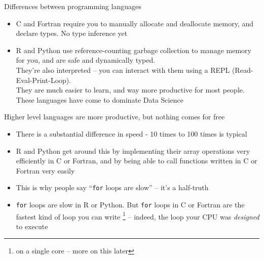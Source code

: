 \documentclass{beamer}
\begin{document}
\begin{frame}{Differences between programming languages}
	\begin{itemize}	
		\item C and Fortran require you to manually allocate and deallocate
		memory, and declare types. No type inference yet
		
		\item R and Python use reference-counting garbage collection to manage
		memory for you, and are safe and dynamically typed.
		\\
		They're also
		interpreted -- you can interact with them using a REPL (Read-Eval-Print-Loop).
		\\
		They are much easier to learn, and way more productive for most people.
		These languages have come to dominate Data Science
	\end{itemize} 
\end{frame}

\begin{frame}{Higher level languages are more productive, but nothing comes for free}
	\begin{itemize}
		\item There is a substantial difference in speed - 10 times to 100 times
		is typical

		\item R and Python get around this by implementing their array operations
		very efficiently in C or Fortran, and by being able to call functions written
		in C or Fortran very easily

		\item This is why people say ``\texttt{for} loops are slow''
		-- it's a half-truth

		\item \texttt{for} loops are slow in R or Python.
		But \texttt{for} loops in C or Fortran are the fastest kind of
		loop you can write \footnote{on a single core -- more on this later} -- indeed, the loop your CPU was \emph{designed}
		to execute

		
	\end{itemize}
\end{frame}
\end{document}
